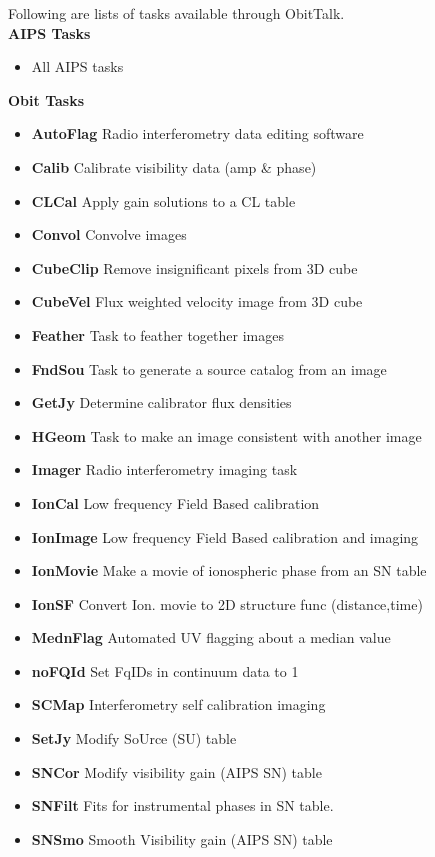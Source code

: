 \documentclass[11pt]{report}
\begin{document}
Following are lists of tasks available through ObitTalk.\\
{\bf AIPS Tasks}
\begin{itemize}
\item All AIPS tasks
\end{itemize}
{\bf Obit Tasks}
\begin{itemize}
\item {\bf AutoFlag}  Radio interferometry data editing software
\item {\bf Calib}     Calibrate visibility data (amp \& phase)
\item {\bf CLCal}     Apply gain solutions to a CL table
\item {\bf Convol}    Convolve images
\item {\bf CubeClip}  Remove insignificant pixels from 3D cube
\item {\bf CubeVel}   Flux weighted velocity image from 3D cube
\item {\bf Feather}   Task to feather together images
\item {\bf FndSou}    Task to generate a source catalog from an image
\item {\bf GetJy}     Determine calibrator flux densities
\item {\bf HGeom}     Task to make an image consistent with another image
\item {\bf Imager}    Radio interferometry imaging task
\item {\bf IonCal }   Low frequency Field Based calibration
\item {\bf IonImage}  Low frequency Field Based calibration and imaging
\item {\bf IonMovie}  Make a movie of ionospheric phase from an SN table
\item {\bf IonSF}     Convert Ion. movie to 2D structure func (distance,time)
\item {\bf MednFlag}  Automated UV flagging about a median value
\item {\bf noFQId}    Set FqIDs in continuum data to 1
\item {\bf SCMap}     Interferometry self calibration imaging
\item {\bf SetJy}     Modify SoUrce (SU) table
\item {\bf SNCor}     Modify visibility gain (AIPS SN) table
\item {\bf SNFilt}    Fits for instrumental phases in SN table.
\item {\bf SNSmo}     Smooth Visibility gain (AIPS SN) table

\end{itemize}
\end{document}
